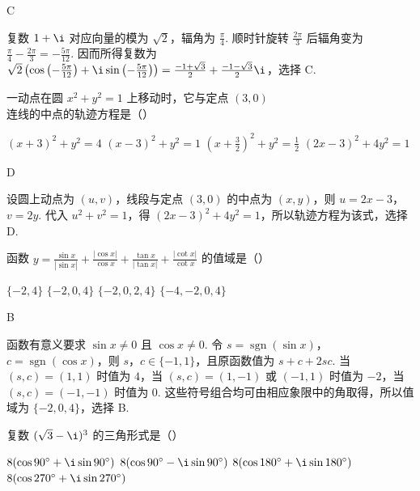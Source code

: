 \begin{answer}
C
\end{answer}

\begin{solution}
复数 \(1+\i\) 对应向量的模为 \(\sqrt2\)，辐角为 \(\frac{\pi}{4}\). 顺时针旋转 \(\frac{2\pi}{3}\) 后辐角变为 \(\frac{\pi}{4}-\frac{2\pi}{3}=-\frac{5\pi}{12}\). 因而所得复数为
\(\sqrt2\left(\cos\left(-\frac{5\pi}{12}\right)+\i\sin\left(-\frac{5\pi}{12}\right)\right)=\frac{-1+\sqrt3}{2}+\frac{-1-\sqrt3}{2}\i\)，选择 C.
\end{solution}

\begin{problem}
一动点在圆 \(x^2+y^2=1\) 上移动时，它与定点 \((3,0)\) 连线的中点的轨迹方程是（\quad）

\choices
    {\((x+3)^2+y^2=4\)}
    {\((x-3)^2+y^2=1\)}
    {\(\left( x+\frac{3}{2} \right)^2+y^2=\frac{1}{2}\)}
    {\((2x-3)^2+4y^2=1\)}
\end{problem}

\begin{answer}
D
\end{answer}

\begin{solution}
设圆上动点为 \((u,v)\)，线段与定点 \((3,0)\) 的中点为 \((x,y)\)，则 \(u=2x-3\)，\(v=2y\). 代入 \(u^2+v^2=1\)，得 \((2x-3)^2+4y^2=1\)，所以轨迹方程为该式，选择 D.
\end{solution}

\begin{problem}
函数 \(y=\frac{\sin x}{|\sin x|}+\frac{|\cos x|}{\cos x}+\frac{\tan x}{|\tan x|}+\frac{|\cot x|}{\cot x}\) 的值域是（\quad）

\choices
    {\(\{-2,4\}\)}
    {\(\{-2,0,4\}\)}
    {\(\{-2,0,2,4\}\)}
    {\(\{-4,-2,0,4\}\)}
\end{problem}

\begin{answer}
B
\end{answer}

\begin{solution}
函数有意义要求 \(\sin x\ne0\) 且 \(\cos x\ne0\). 令 \(s=\operatorname{sgn}(\sin x)\)，\(c=\operatorname{sgn}(\cos x)\)，则 \(s\)，\(c\in\{-1,1\}\)，且原函数值为 \(s+c+2sc\). 当 \((s,c)=(1,1)\) 时值为 \(4\)，当 \((s,c)=(1,-1)\) 或 \((-1,1)\) 时值为 \(-2\)，当 \((s,c)=(-1,-1)\) 时值为 \(0\). 这些符号组合均可由相应象限中的角取得，所以值域为 \(\{-2,0,4\}\)，选择 B.
\end{solution}

\begin{problem}
复数 \((\sqrt{3}-\i)^3\) 的三角形式是（\quad）

\choices
    {\(8(\cos 90^\circ+\i\sin 90^\circ)\)}
    {\(8(\cos 90^\circ-\i\sin 90^\circ)\)}
    {\(8(\cos 180^\circ+\i\sin 180^\circ)\)}
    {\(8(\cos 270^\circ+\i\sin 270^\circ)\)}
\end{problem}

